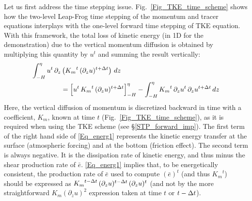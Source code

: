\documentclass[NEMO_book]{subfiles}
\begin{document}
Let us first address the time stepping issue. Fig.~\ref{Fig_TKE_time_scheme} shows 
how the two-level Leap-Frog time stepping of the momentum and tracer equations interplays 
with the one-level forward time stepping of TKE equation. With this framework, the total loss 
of kinetic energy (in 1D for the demonstration) due to the vertical momentum diffusion is 
obtained by multiplying this quantity by $u^t$ and summing the result vertically:   
\begin{equation} \label{Eq_energ1}
\begin{split}
\int_{-H}^{\eta}  u^t \,\partial_z &\left( {K_m}^t \,(\partial_z u)^{t+\Delta t}  \right) \,dz   \\
&= \Bigl[  u^t \,{K_m}^t \,(\partial_z u)^{t+\Delta t} \Bigr]_{-H}^{\eta}          
 - \int_{-H}^{\eta}{ {K_m}^t \,\partial_z{u^t} \,\partial_z u^{t+\Delta t} \,dz }
\end{split}
\end{equation}
Here, the vertical diffusion of momentum is discretized backward in time 
with a coefficient, $K_m$, known at time $t$ (Fig.~\ref{Fig_TKE_time_scheme}), 
as it is required when using the TKE scheme (see \S\ref{STP_forward_imp}). 
The first term of the right hand side of \eqref{Eq_energ1} represents the kinetic energy 
transfer at the surface (atmospheric forcing) and at the bottom (friction effect). 
The second term is always negative. It is the dissipation rate of kinetic energy, 
and thus minus the shear production rate of $\bar{e}$. \eqref{Eq_energ1} 
implies that, to be energetically consistent, the production rate of $\bar{e}$ 
used to compute $(\bar{e})^t$ (and thus ${K_m}^t$) should be expressed as 
${K_m}^{t-\Delta t}\,(\partial_z u)^{t-\Delta t} \,(\partial_z u)^t$ (and not by the more straightforward 
$K_m \left( \partial_z u \right)^2$ expression taken at time $t$ or $t-\Delta t$).
\end{document}
